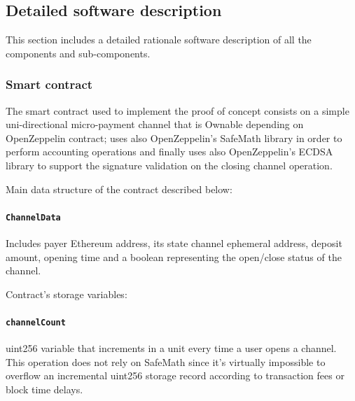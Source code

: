\documentclass[12pt]{amsart}
\begin{document}
\begin{multicols}{2}
\subsection{Detailed software description}

\vspace{0.35cm}

This section includes a detailed rationale software description of all
the components and sub-components.

\subsubsection{Smart contract}

\vspace{0.35cm}

The smart contract\cite{state-channel-contract-a} used
to implement the proof of concept consists on a simple
uni-directional micro-payment channel that is Ownable
depending on OpenZeppelin contract; uses also OpenZeppelin's
SafeMath library in order to perform accounting operations
and finally uses also OpenZeppelin's ECDSA library to support
the signature validation on the closing channel operation.

\vspace{0.35cm}

Main data structure of the contract described below:

\vspace{0.35cm}

\paragraph{\texttt{ChannelData}} Includes payer Ethereum address,
its state channel ephemeral address, deposit amount, opening time
and a boolean representing the open/close status of the channel.

\vspace{0.35cm}

Contract's storage variables:

\vspace{0.35cm}

\paragraph{\texttt{channelCount}} uint256 variable that increments
in a unit every time a user opens a channel. This operation
does not rely on SafeMath since it's virtually impossible to
overflow an incremental
uint256 storage record according to transaction fees or block time delays.


\end{multicols}
\end{document}
